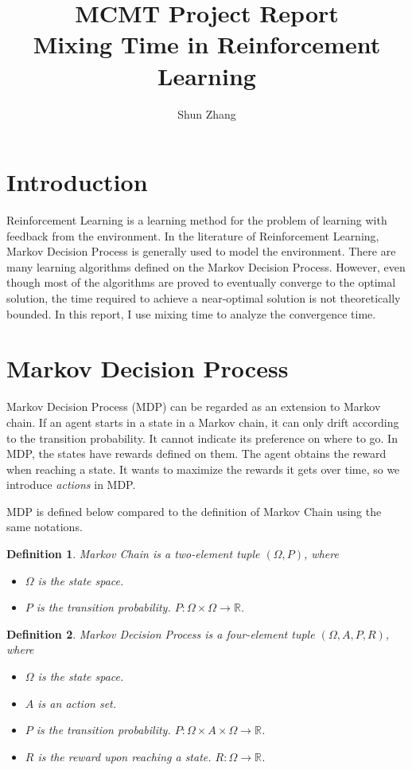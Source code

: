 \documentclass[10pt]{article}
\title{MCMT Project Report\\Mixing Time in Reinforcement Learning}
\author{Shun Zhang}
\date{}
\newtheorem{definition}{Definition}
\newcommand{\R}{\mathbb{R}}
\begin{document}
\maketitle

\section{Introduction}

Reinforcement Learning is a learning method for the problem of learning with
feedback from the environment. In the literature of Reinforcement Learning,
Markov Decision Process is generally used to model the environment. There are
many learning algorithms defined on the Markov Decision Process. However, even
though most of the algorithms are proved to eventually converge to the optimal
solution, the time required to achieve a near-optimal solution is not
theoretically bounded.  In this report, I use mixing time to analyze the
convergence time.


\section{Markov Decision Process}
\label{sec:mdp}

Markov Decision Process (MDP) can be regarded as an extension to Markov chain.
If an agent starts in a state in a Markov chain, it can only drift according to
the transition probability. It cannot indicate its preference on where to go. In
MDP, the states have rewards defined on them. The agent obtains the reward when
reaching a state. It wants to maximize the rewards it gets over time, so we
introduce {\em actions} in MDP.

MDP is defined below compared to the definition of Markov Chain using the same
notations.

\begin{definition}
Markov Chain is a two-element tuple $(\Omega, P)$, where
\begin{itemize}
\item $\Omega$ is the state space.
\item $P$ is the transition probability. $P: \Omega \times \Omega \rightarrow
\R$.
\end{itemize}
\end{definition}

\begin{definition}
Markov Decision Process is a four-element tuple $(\Omega, A, P, R)$, where
\begin{itemize}
\item $\Omega$ is the state space.
\item $A$ is an action set.
\item $P$ is the transition probability. $P: \Omega \times A \times \Omega
\rightarrow \R$.
\item $R$ is the reward upon reaching a state. $R: \Omega \rightarrow \R$.
\cite{rl}
\end{itemize}
\end{definition}
\end{document}
